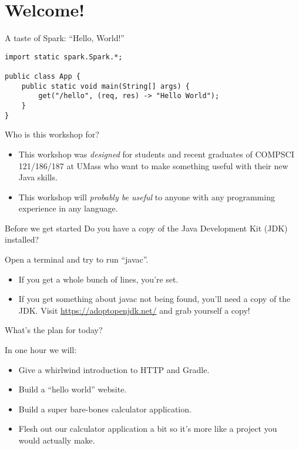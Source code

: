 \section{Welcome!}

\begin{frame}[fragile]{A taste of Spark: ``Hello, World!''}
\begin{verbatim}
import static spark.Spark.*;

public class App {
    public static void main(String[] args) {
        get("/hello", (req, res) -> "Hello World");
    }
}
\end{verbatim}
\end{frame}

\begin{frame}{Who is this workshop for?}
\begin{itemize}
    \item This workshop was \textit{designed} for students and recent graduates of COMPSCI 121/186/187 at UMass who want to make something useful with their new Java skills.
    \item This workshop will \textit{probably be useful} to anyone with any programming experience in any language.
\end{itemize}
\end{frame}

\begin{frame}{Before we get started}
Do you have a copy of the Java Development Kit (JDK) installed?

Open a terminal and try to run ``javac''.
\begin{itemize}
    \item If you get a whole bunch of lines, you're set.
    \item If you get something about javac not being found, you'll need a copy of the JDK. Visit \url{https://adoptopenjdk.net/} and grab yourself a copy!
\end{itemize}
\end{frame}

\begin{frame}{What's the plan for today?}
\begin{center}
    
\end{center}
In one hour we will:
\begin{itemize}
    \item Give a whirlwind introduction to HTTP and Gradle.
    \item Build a ``hello world'' website.
    \item Build a super bare-bones calculator application.
    \item Flesh out our calculator application a bit so it's more like a project you would actually make.
\end{itemize}
\end{frame}